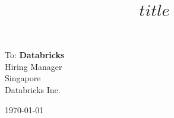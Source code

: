 \documentclass[11pt, a4paper]{article}
\title{$title$}
\begin{document}
\maketitle
\vspace{1em}

\begin{minipage}[t]{0.49\textwidth} 
  To: {\bf Databricks} \\
  {
    Hiring Manager\\
    Singapore\\
    Databricks Inc.
  }
\end{minipage}\hfill\begin{minipage}[t]{0.49\textwidth}
  \begin{flushright}\today\end{flushright}
\end{minipage}

\vspace{2em}
\end{document}
